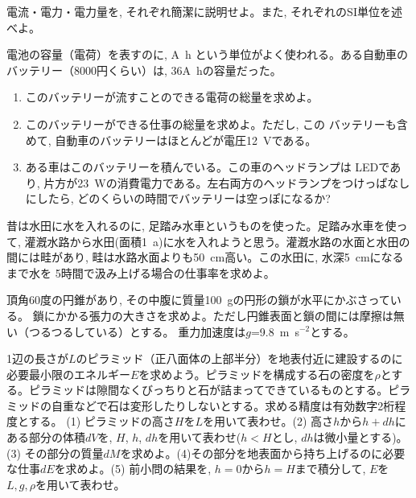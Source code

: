 \begin{q}\label{eq:def_electricity} 電流・電力・電力量を, 
それぞれ簡潔に説明せよ。また, それぞれのSI単位を述べよ。
\end{q}\mv


\begin{q}\label{eq:battery_Ah} 電池の容量（電荷）を表すのに, A~h
という単位がよく使われる。ある自動車のバッテリー（8000円くらい）は, 
36A~hの容量だった。
\begin{enumerate}
\item このバッテリーが流すことのできる電荷の総量を求めよ。
\item このバッテリーができる仕事の総量を求めよ。ただし, この
バッテリーも含めて, 自動車のバッテリーはほとんどが電圧12~Vである。
\item ある車はこのバッテリーを積んでいる。この車のヘッドランプは
LEDであり, 片方が23~Wの消費電力である。左右両方のヘッドランプをつけっぱなし
にしたら, どのくらいの時間でバッテリーは空っぽになるか?
\end{enumerate}
\end{q}
\hv

\begin{exq} 昔は水田に水を入れるのに, 足踏み水車というものを使った。足踏み水車を使って, 
灌漑水路から水田(面積1~a)に水を入れようと思う。灌漑水路の水面と水田の
間には畦があり, 畦は水路水面よりも50~cm高い。この水田に, 水深5~cmになるまで水を
5時間で汲み上げる場合の仕事率を求めよ。\end{exq}

\begin{exq} 頂角60度の円錐があり, その中腹に質量100~gの円形の鎖が水平にかぶさっている。
鎖にかかる張力の大きさを求めよ。ただし円錐表面と鎖の間には摩擦は無い（つるつるしている）とする。
重力加速度は$g$=9.8~m~s$^{-2}$とする。\end{exq}

\begin{exq} 1辺の長さが$L$のピラミッド（正八面体の上部半分）を地表付近に建設するのに必要最小限のエネルギー$E$を求めよう。ピラミッドを構成する石の密度を$\rho$とする。ピラミッドは隙間なくびっちりと石が詰まってできているものとする。ピラミッドの自重などで石は変形したりしないとする。求める精度は有効数字2桁程度とする。
(1) ピラミッドの高さ$H$を$L$を用いて表わせ。(2) 高さ$h$から$h+dh$にある部分の体積$dV$を, $H$, $h$, $dh$を用いて表わせ($h<H$とし, $dh$は微小量とする)。(3) その部分の質量$dM$を求めよ。(4)その部分を地表面から持ち上げるのに必要な仕事$dE$を求めよ。(5) 前小問の結果を, $h=0$から$h=H$まで積分して, $E$を$L, g, \rho$を用いて表わせ。\end{exq}
\hv


